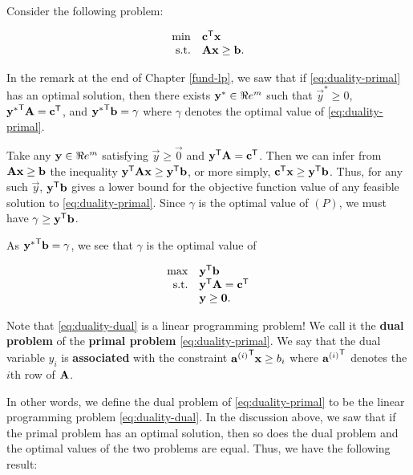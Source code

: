 Consider the following problem:

\begin{equation}
\begin{array}{rl}
\min & \mathbf{c}^{\mathsf{T}}\mathbf{x} \\
\mbox{s.t.} & \mathbf{A}\mathbf{x} \geq \mathbf{b}.
\label{eq:duality-primal}
\end{array}
\end{equation}

In the remark at the end of Chapter \ref{fund-lp}, we saw that if
\eqref{eq:duality-primal} has an optimal solution, then there exists
\(\mathbf{y}^*\in\Re e^m\) such that \(\vec{y}^* \geq 0\),
\({\mathbf{y}^*}^{\mathsf{T}}\mathbf{A} = \mathbf{c}^{\mathsf{T}}\), and
\({\mathbf{y}^*}^{\mathsf{T}}\mathbf{b} = \gamma\) where \(\gamma\) denotes the optimal
value of \eqref{eq:duality-primal}.

Take any \(\mathbf{y}\in\Re e^m\) satisfying \(\vec{y} \geq \vec{0}\) and
\(\mathbf{y}^{\mathsf{T}}\mathbf{A} = \mathbf{c}^{\mathsf{T}}\). Then we can infer from
\(\mathbf{A}\mathbf{x}\geq \mathbf{b}\) the inequality
\(\mathbf{y}^{\mathsf{T}}\mathbf{A}\mathbf{x} \geq \mathbf{y}^{\mathsf{T}} \mathbf{b}\), or more simply,
\(\mathbf{c}^{\mathsf{T}}\mathbf{x} \geq \mathbf{y}^{\mathsf{T}} \mathbf{b}\). Thus, for any such
\(\vec{y}\), \(\mathbf{y}^{\mathsf{T}} \mathbf{b}\) gives a lower bound for the
objective function value of any feasible solution to
\eqref{eq:duality-primal}. Since \(\gamma\) is the optimal value of
\((P)\), we must have \(\gamma \geq \mathbf{y}^{\mathsf{T}}\mathbf{b}\).

As \({\mathbf{y}^*}^{\mathsf{T}}\mathbf{b} = \gamma\), we see that \(\gamma\) is the
optimal value of

\begin{equation}
\begin{array}{rl}
\max & \mathbf{y}^{\mathsf{T}}\mathbf{b} \\
\mbox{s.t.} & \mathbf{y}^{\mathsf{T}}\mathbf{A} = \mathbf{c}^{\mathsf{T}} \\
&\mathbf{y} \geq \mathbf{0}.
\end{array}\label{eq:duality-dual}
\end{equation}

Note that \eqref{eq:duality-dual} is a linear programming problem! We call
it the \textbf{dual problem} of the \textbf{primal problem}
\eqref{eq:duality-primal}. We say that the dual variable \(y_i\) is
\textbf{associated} with the constraint
\({\mathbf{a}^{(i)}}^{\mathsf{T}} \mathbf{x} \geq b_i\) where \({\mathbf{a}^{(i)}}^{\mathsf{T}}\)
denotes the \(i\)th row of \(\mathbf{A}\).

In other words, we define the dual problem of \eqref{eq:duality-primal} to
be the linear programming problem \eqref{eq:duality-dual}. In the
discussion above, we saw that if the primal problem has an optimal
solution, then so does the dual problem and the optimal values of the
two problems are equal. Thus, we have the following result:


